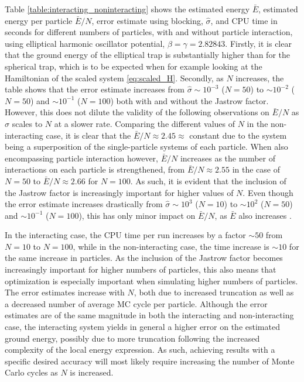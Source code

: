 \documentclass[%
oneside,                 %
final,                   %
10pt]{article}
\begin{document}
Table \ref{table:interacting_noninteracting} shows the estimated energy $\bar{E}$, estimated energy per particle $\bar E /N$, error estimate using blocking, $\hat \sigma$, and CPU time in seconds for different numbers of particles, with and without particle interaction, using elliptical harmonic oscillator potential, $\beta=\gamma=2.82843$. Firstly, it is clear that the ground energy of the elliptical trap is substantially higher than for the spherical trap, which is to be expected when for example looking at the Hamiltonian of the scaled system \eqref{eq:scaled_H}. Secondly, as $N$ increases, the table shows that the error estimate increases from $\hat \sigma \sim 10^{-3}$ ($N=50$) to $\sim 10^{-2}$ ($N=50$) and $\sim 10^{-1}$ ($N=100$) both with and without the Jastrow factor. However, this does not dilute the validity of the following observations on $\bar E/N$ as $\hat \sigma$ scales to $N$ at a slower rate. Comparing the different values of $N$ in the non-interacting case, it is clear that the $\bar E/N\approx 2.45\approx$ constant due to the system being a superposition of the single-particle systems of each particle. When also encompassing particle interaction however, $\bar E/N$ increases as the number of interactions on each particle is strengthened, from $\bar E/N\approx2.55$ in the case of $N=50$ to $\bar E/N\approx2.66$ for $N=100$. As such, it is evident that the inclusion of the Jastrow factor is increasingly important for higher values of $N$. Even though the error estimate increases drastically from $\hat \sigma \sim 10^3$ ($N=10$)  to $\sim 10^2$ ($N=50$) and $\sim 10^{-1}$ ($N=100$), this has only minor impact on $\bar E/N$, as $\bar E$ also increases .
  

In the interacting case, the CPU time per run increases by a factor $\sim 50$ from $N=10$ to $N=100$, while in the non-interacting case, the time increase is $\sim 10$ for the same increase in particles. As the inclusion of the Jastrow factor becomes increasingly important for higher numbers of particles, this also means that optimization is especially important when simulating higher numbers of particles. The error estimates increase with $N$, both due to increased truncation as well as a decreased number of average MC cycle per particle. Although the error estimates are of the same magnitude in both the interacting and non-interacting case, the interacting system yields in general a higher error on the estimated ground energy, possibly due to more truncation following the increased complexity of the local energy expression. As such, achieving results with a specific desired accuracy will most likely require increasing the number of Monte Carlo cycles as $N$ is increased.
\end{document}
